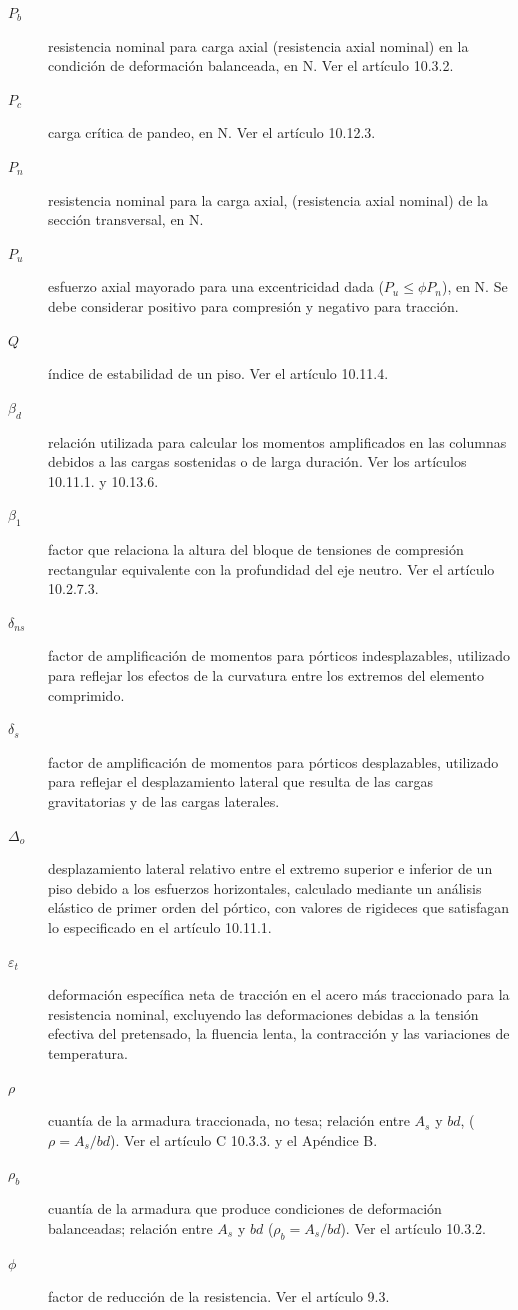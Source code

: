 \documentclass[twocolumn]{article}
\begin{document}
\begin{description}
	
	\item[$P_b$] resistencia nominal para carga axial (resistencia axial nominal) en la condición de deformación balanceada, en N. Ver el artículo 10.3.2.
	\item[$P_c$] carga crítica de pandeo, en N. Ver el artículo 10.12.3.
	\item[$P_n$] resistencia nominal para la carga axial, (resistencia axial nominal) de la sección transversal, en N.
	\item[$P_u$] esfuerzo axial mayorado para una excentricidad dada ($P_u \leq \phi P_n$), en N. Se debe considerar positivo para compresión y negativo para tracción.
	\item[$Q$] índice de estabilidad de un piso. Ver el artículo 10.11.4.
	\item[$\beta_d$] relación utilizada para calcular los momentos amplificados en las columnas
	debidos a las cargas sostenidas o de larga duración. Ver los artículos 10.11.1. y
	10.13.6.
	\item[$\beta_1$] factor que relaciona la altura del bloque de tensiones de compresión rectangular
	equivalente con la profundidad del eje neutro. Ver el artículo 10.2.7.3.
	\item[$\delta_{ns}$] factor de amplificación de momentos para pórticos indesplazables, utilizado para
	reflejar los efectos de la curvatura entre los extremos del elemento comprimido.
	\item[$\delta_s$] factor de amplificación de momentos para pórticos desplazables, utilizado para
	reflejar el desplazamiento lateral que resulta de las cargas gravitatorias y de las
	cargas laterales.
	\item[$\Delta_o$] desplazamiento lateral relativo entre el extremo superior e inferior de un piso
	debido a los esfuerzos horizontales, calculado mediante un análisis elástico de
	primer orden del pórtico, con valores de rigideces que satisfagan lo especificado
	en el artículo 10.11.1.
	\item[$\varepsilon_t$] deformación específica neta de tracción en el acero más traccionado para la
	resistencia nominal, excluyendo las deformaciones debidas a la tensión efectiva del pretensado, la fluencia lenta, la contracción y las variaciones de temperatura.
	\item[$\rho$] cuantía de la armadura traccionada, no tesa; relación entre $A_s$ y $b d$, ($\rho = A_s /b d$). Ver el artículo C 10.3.3. y el Apéndice B.
	\item[$\rho_b$] cuantía de la armadura que produce condiciones de deformación balanceadas;	relación entre $A_s$ y $b d$ ($\rho_b = A_s/b d$). Ver el artículo 10.3.2.
	\item[$\phi$] factor de reducción de la resistencia. Ver el artículo 9.3.
\end{description}
\end{document}
